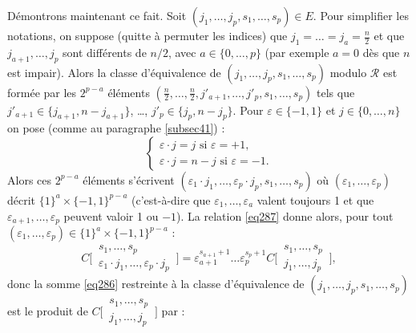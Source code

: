 \documentclass[12pt,francais, reqno]{smfart}
\numberwithin{equation}{section}
\newcommand{\cjs}{C\bigg[\,\begin{matrix} s_1, \ldots, s_p\\j_1, \ldots, j_p\end{matrix}\,\bigg]}
\newcommand{\cjsparsixbis}{C\bigg[\,\begin{matrix} s_1, \ldots, s_p\\ \eps_1 \cdot j_1, \ldots, \eps_p \cdot j_p\end{matrix}\,\bigg]}
\newcommand{\eps}{\varepsilon}
\newcommand{\zerop}{\{0,\ldots, p\}}
\newcommand{\zeron}{\{0,\ldots, n\}}
\newcommand{\croix}{\times}
\newcommand{\calr}{{\mathscr{R}}}
\begin{document}
D\'emontrons maintenant ce fait. 
Soit $(j_1,\ldots, j_p, s_1, \ldots, s_p) \in E$. Pour simplifier les notations, on suppose (quitte \`a permuter les indices) que $j_1  =  \ldots = j_a = \frac{n}{2}$ et que $j_{a+1}, \ldots, j_p$ sont diff\'erents de $n/2$, avec $ a \in \zerop$ (par exemple $a=0$ d\`es que $n$ est impair). Alors la classe d'\'equivalence de $(j_1,\ldots, j_p, s_1, \ldots, s_p)$ modulo $\calr$ est form\'ee par les $2^{p-a}$ \'el\'ements $(\frac{n}{2},\ldots, \frac{n}{2}, j'_{a+1}, \ldots, j'_p, s_1, \ldots, s_p)$ tels que $j'_{a+1} \in \{j_{a+1}, n-j_{a+1}\}$, \ldots, $ j'_p \in \{j_p, n-j_p\}$. Pour $\eps \in \{-1, 1\}$ et $j \in \zeron$ on pose (comme au paragraphe \ref{subsec41}) :
$$
\left\{
\begin{array}{l}
\eps \cdot j =j \mbox{ si } \eps = + 1,\\
\eps \cdot j =n-j \mbox{ si } \eps = - 1.
\end{array}
\right.
$$
Alors ces $2^{p-a}$ \'el\'ements s'\'ecrivent $(\eps_1 \cdot j_1, \ldots, \eps_p \cdot j_p, s_1, \ldots, s_p)$ o\`u $(\eps_1, \ldots, \eps_p)$ d\'ecrit $\{1\}^a \croix \{-1,1\}^{p-a}$ (c'est-\`a-dire que $\eps_1, \ldots, \eps_a$ valent toujours 1 et que $\eps_{a+1}, \ldots, \eps_p$ peuvent valoir 1 ou $-1$). La relation \eqref{eq287} donne alors, pour tout $ (\eps_1, \ldots, \eps_p) \in \{1\}^a \croix \{-1,1\}^{p-a}$  : 
$$
\cjsparsixbis = \eps_{a+1}^{s_{a+1}+1} \ldots  \eps_p^{s_p+1} \cjs,
$$
donc la somme \eqref{eq286} restreinte \`a la classe d'\'equivalence de $(j_1,\ldots, j_p, s_1, \ldots, s_p)$  est le produit de $\cjs$ par : 
\end{document}
